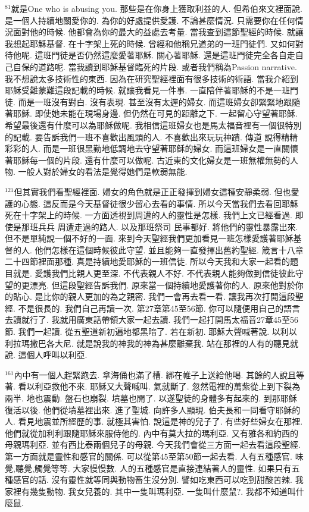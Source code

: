 \documentclass{book}
\begin{document}
$^{81}$就是One who is abusing you.
那些是在你身上獲取利益的人.
但希伯來文裡面說.
是一個人持續地關愛你的.
為你的好處提供愛護.
不論甚麼情況.
只需要你在任何情況面對他的時候.
他都會為你的最大的益處去考量.
當我查到這節聖經的時候.
就讓我想起耶穌基督.
在十字架上死的時候.
曾經和他稱兄道弟的一班門徒們.
又如何對待他呢.
這班門徒是否仍然這麼愛著耶穌.
關心著耶穌.
還是這班門徒完全各自走自己自保的道路呢.
當我讀到耶穌基督臨死的片段.
或者我們稱為Passion narrative.
我不想說太多技術性的東西.
因為在研究聖經裡面有很多技術的術語.
當我介紹到耶穌受難蒙難這段記載的時候.
就讓我看見一件事.
一直陪伴著耶穌的不是一班門徒.
而是一班沒有對白.
沒有表現.
甚至沒有太遲的婦女.
而這班婦女卻緊緊地跟隨著耶穌.
即使她未能在現場身邊.
但仍然在可見的距離之下.
一起留心守望著耶穌.
希望最後還有什麼可以為耶穌做呢.
我相信這班婦女也是馬太福音裡有一個很特別的記載.
要告訴我們一班不喜歡出風頭的人.
不喜歡出來玩玩神蹟.
傳道 說得精精彩彩的人.
而是一班很黑勤地低調地去守望著耶穌的婦女.
而這班婦女是一直關懷著耶穌每一個的片段.
還有什麼可以做呢.
古近東的文化婦女是一班無權無勢的人物.
一般人對於婦女的看法是覺得她們是軟弱無能.

$^{121}$但其實我們看聖經裡面.
婦女的角色就是正正發揮到婦女這種安靜柔弱.
但也愛護的心態.
這反而是今天基督徒很少留心去看的事情.
所以今天當我們去看回耶穌死在十字架上的時候.
一方面透視到周遭的人的靈性是怎樣.
我們上文已經看過.
即使是那班兵兵 周遭走過的路人.
以及那班祭司 民事都好.
將他們的靈性暴露出來.
但不是單純說一個不好的一面.
來到今天聖經我們更加看見一班怎樣愛護著耶穌基督的人.
他們怎樣在這個時候彼此守望.
並且能夠一直發揮出舊約聖經.
箴言十八章二十四節裡面那種.
真是持續地愛耶穌的一班信徒.
所以今天我和大家一起看的題目就是.
愛護我們比親人更至深.
不代表親人不好.
不代表親人能夠做到信徒彼此守望的更漂亮.
但這段聖經告訴我們.
原來當一個持續地愛護著你的人.
原來他對於你的貼心.
是比你的親人更加的為之親密.
我們一會再去看一看.
讓我再次打開這段聖經.
不是很長的.
我們自己再讀一次.
第27章第45至56節.
你可以隨便用自己的語言去讀就行了.
我就用廣東話帶領大家一起去讀.
我們一起打開馬太福音27章45至56節.
我們一起讀.
從五聖道新初遍地都黑暗了.
若在新初.
耶穌大聲喊著說.
以利以利拉瑪撒巴各大尼.
就是說我的神我的神為甚麼離棄我.
站在那裡的人有的聽見就說.
這個人呼叫以利亞.

$^{161}$內中有一個人趕緊跑去.
拿海俑也滿了槽.
綁在帷子上送給他喝.
其餘的人說且等著.
看以利亞救他不來.
耶穌又大聲喊叫.
氣就斷了.
忽然電裡的萬紫從上到下裂為兩半.
地也震動.
盤石也崩裂.
墳墓也開了.
以遂聖徒的身體多有起來的.
到那耶穌復活以後.
他們從墳墓裡出來.
進了聖城.
向許多人顯現.
伯夫長和一同看守耶穌的人.
看見地震並所經歷的事.
就極其害怕.
說這是神的兒子了.
有些好些婦女在那裡.
他們就從加利利跟隨耶穌來服侍他的.
內中有莫大拉的瑪利亞.
又有雅各和約西的母親瑪利亞.
並有西比泰兩個兒子的母親.
今天我們會從三方面一起去看這段聖經.
第一方面就是靈性和感官的關係.
可以從第45至第50節一起去看.
人有五種感官.
味覺,聽覺,觸覺等等.
大家慢慢數.
人的五種感官是直接連結著人的靈性.
如果只有五種感官的話.
沒有靈性就等同與動物畜生沒分別.
譬如吃東西可以吃到甜酸苦辣.
我家裡有幾隻動物.
我女兒養的.
其中一隻叫瑪利亞.
一隻叫什麼鼠?.
我都不知道叫什麼鼠.
\end{document}
